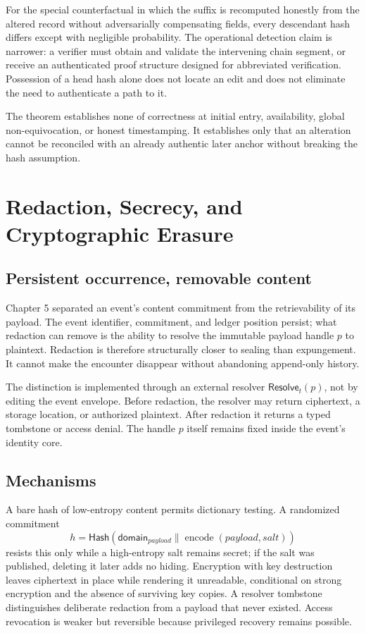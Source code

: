 \documentclass[11pt,openany]{book}
\newcommand{\Hash}{\mathsf{Hash}}
\begin{document}
For the special counterfactual in which the suffix is recomputed honestly from
the altered record without adversarially compensating fields, every descendant
hash differs except with negligible probability. The operational detection
claim is narrower: a verifier must obtain and validate the intervening chain
segment, or receive an authenticated proof structure designed for abbreviated
verification. Possession of a head hash alone does not locate an edit and does
not eliminate the need to authenticate a path to it.

The theorem establishes none of correctness at initial entry, availability,
global non-equivocation, or honest timestamping. It establishes only that an
alteration cannot be reconciled with an already authentic later anchor without
breaking the hash assumption.

\chapter{Redaction, Secrecy, and Cryptographic Erasure}
\section{Persistent occurrence, removable content}
Chapter 5 separated an event's content commitment from the retrievability of
its payload. The event identifier, commitment, and ledger position persist;
what redaction can remove is the ability to resolve the immutable payload
handle \(p\) to plaintext. Redaction is therefore structurally closer to
sealing than expungement. It cannot make the encounter disappear without
abandoning append-only history.

The distinction is implemented through an external resolver
\(\mathsf{Resolve}_t(p)\), not by editing the event envelope. Before redaction,
the resolver may return ciphertext, a storage location, or authorized
plaintext. After redaction it returns a typed tombstone or access denial. The
handle \(p\) itself remains fixed inside the event's identity core.

\section{Mechanisms}
A bare hash of low-entropy content permits dictionary testing. A randomized
commitment
\[
 h=\Hash(\mathsf{domain}_{payload}\parallel
         \operatorname{encode}(payload,salt))
\]
resists this only while a high-entropy salt remains secret; if the salt was
published, deleting it later adds no hiding. Encryption with key destruction
leaves ciphertext in place while rendering it unreadable, conditional on
strong encryption and the absence of surviving key copies. A resolver
tombstone distinguishes deliberate redaction from a payload that never existed.
Access revocation is weaker but reversible because privileged recovery remains
possible.
\end{document}
